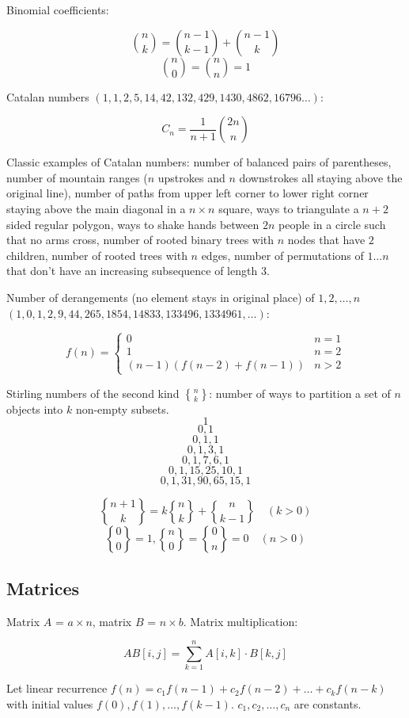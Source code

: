 \documentclass{article}
\DeclareRobustCommand{\stirling}{\genfrac\{\}{0pt}{}} %
\begin{document}
Binomial coefficients:

\[ \binom{n}{k} = \binom{n-1}{k-1} + \binom{n-1}{k} \]
\[ \binom{n}{0} = \binom{n}{n} = 1 \]

Catalan numbers $(1, 1, 2, 5, 14, 42, 132, 429, 1430, 4862, 16796 \dots)$:

\[ C_n = \frac{1}{n+1} \binom{2n}{n} \]

Classic examples of Catalan numbers: number of balanced pairs of parentheses,  number of mountain ranges ($n$ upstrokes and $n$ downstrokes all staying above the original line), number of paths from upper left corner to lower right corner staying above the main diagonal in a $n \times n$ square, ways to triangulate a $n+2$ sided regular polygon, ways to shake hands between $2n$ people in a circle such that no arms cross, number of rooted binary trees with $n$ nodes that have $2$ children, number of rooted trees with $n$ edges, number of permutations of $1 \dots n$ that don't have an increasing subsequence of length $3$.

Number of derangements (no element stays in original place) of $1, 2, \dots, n$ $(1, 0, 1, 2, 9, 44, 265, 1854, 14833, 133496, 1334961, \dots)$:

\[
	f(n) =
	\begin{cases}
		0 &n = 1 \\
		1 &n = 2 \\
		(n-1)(f(n-2)+f(n-1)) &n > 2
	\end{cases}
\]

Stirling numbers of the second kind $\stirling{n}{k}$: number of ways to partition a set of $n$ objects into $k$ non-empty subsets.
\[ 1 \] \[ 0, 1 \] \[0, 1, 1 \] \[0, 1, 3, 1 \] \[ 0, 1, 7, 6, 1 \] \[ 0, 1, 15, 25, 10, 1 \] \[ 0, 1, 31, 90, 65, 15, 1 \]

\[ \stirling{n+1}{k} = k\stirling{n}{k}+\stirling{n}{k-1} \quad (k > 0) \] 
\[ \stirling{0}{0} = 1, \stirling{n}{0} = \stirling{0}{n} = 0 \quad (n > 0) \]

\subsection {Matrices}

Matrix $A$ = $a \times n$, matrix $B$ = $n \times b$. Matrix multiplication:

\[ AB[i,j] = \sum_{k=1}^{n} A[i,k] \cdot B[k,j] \]

Let linear recurrence $f(n) = c_1f(n-1) + c_2f(n-2) + \dots + c_kf(n-k)$ with initial values $f(0), f(1), \dots, f(k-1)$. $c_1, c_2, \dots, c_n$ are constants.
\end{document}
